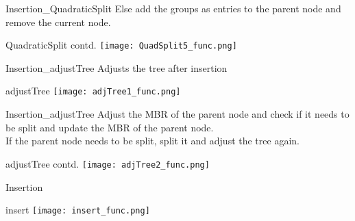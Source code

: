 \documentclass{beamer}
\begin{document}
\begin{frame}{Insertion_{QuadraticSplit}}
Else add the groups as entries to the parent node and remove the current node.
    \begin{block}{QuadraticSplit contd.}
       \texttt{[image: QuadSplit5\_func.png]}
    \end{block}
\end{frame}
\begin{frame}{Insertion_{adjustTree}}
Adjusts the tree after insertion
    \begin{block}{adjustTree}
       \texttt{[image: adjTree1\_func.png]}
    \end{block}
\end{frame}
\begin{frame}{Insertion_{adjustTree}}
Adjust the MBR of the parent node and check if it needs to be split and update the MBR of the parent node.\\
\bigskip
If the parent node needs to be split, split it and adjust the tree again.
    \begin{block}{adjustTree contd.}
       \texttt{[image: adjTree2\_func.png]}
    \end{block}
\end{frame}
\begin{frame}{Insertion}
    \begin{block}{insert}
       \texttt{[image: insert\_func.png]}
    \end{block}
\end{frame}
\end{document}
